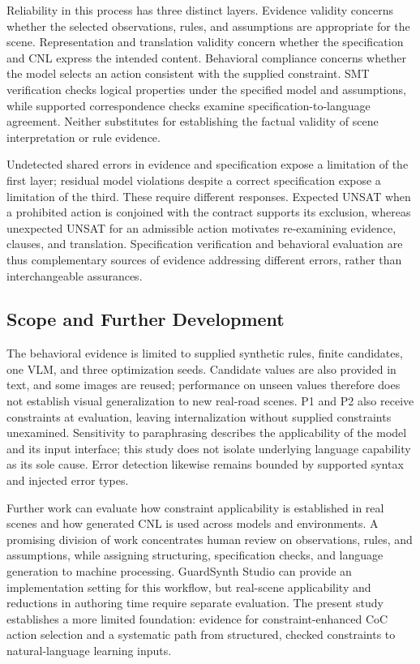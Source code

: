 \documentclass[nolineno]{ieeeaccess}
\begin{document}
Reliability in this process has three distinct layers. Evidence validity concerns whether the selected observations, rules, and assumptions are appropriate for the scene. Representation and translation validity concern whether the specification and CNL express the intended content. Behavioral compliance concerns whether the model selects an action consistent with the supplied constraint. SMT verification checks logical properties under the specified model and assumptions, while supported correspondence checks examine specification-to-language agreement. Neither substitutes for establishing the factual validity of scene interpretation or rule evidence.\par

Undetected shared errors in evidence and specification expose a limitation of the first layer; residual model violations despite a correct specification expose a limitation of the third. These require different responses. Expected UNSAT when a prohibited action is conjoined with the contract supports its exclusion, whereas unexpected UNSAT for an admissible action motivates re-examining evidence, clauses, and translation. Specification verification and behavioral evaluation are thus complementary sources of evidence addressing different errors, rather than interchangeable assurances.\par

\subsection{Scope and Further Development}

The behavioral evidence is limited to supplied synthetic rules, finite candidates, one VLM, and three optimization seeds. Candidate values are also provided in text, and some images are reused; performance on unseen values therefore does not establish visual generalization to new real-road scenes. P1 and P2 also receive constraints at evaluation, leaving internalization without supplied constraints unexamined. Sensitivity to paraphrasing describes the applicability of the model and its input interface; this study does not isolate underlying language capability as its sole cause. Error detection likewise remains bounded by supported syntax and injected error types.\par

Further work can evaluate how constraint applicability is established in real scenes and how generated CNL is used across models and environments. A promising division of work concentrates human review on observations, rules, and assumptions, while assigning structuring, specification checks, and language generation to machine processing. GuardSynth Studio can provide an implementation setting for this workflow, but real-scene applicability and reductions in authoring time require separate evaluation. The present study establishes a more limited foundation: evidence for constraint-enhanced CoC action selection and a systematic path from structured, checked constraints to natural-language learning inputs.\par
\end{document}
